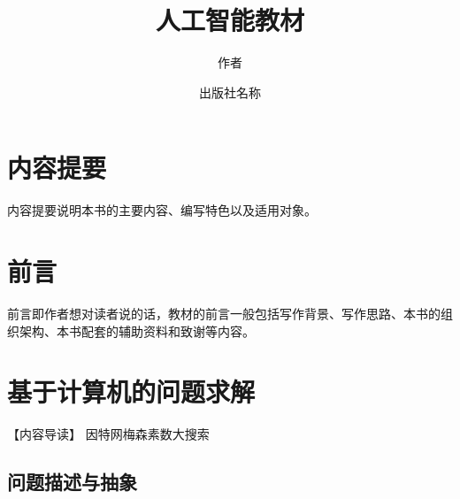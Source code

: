 \documentclass[fontset=windows,openany,UTF8]{ctexbook}
\begin{document}
\title{人工智能教材}
\author{作者}
\date{\vspace*{3in}出版社名称}

\maketitle
\thispagestyle{empty}
\frontmatter

\chapter*{内容提要}

内容提要说明本书的主要内容、编写特色以及适用对象。
\clearpage

\chapter*{前\qquad 言}
前言即作者想对读者说的话，教材的前言一般包括写作背景、写作思路、本书的组织架构、本书配套的辅助资料和致谢等内容。


{\centering\tableofcontents}

\mainmatter

\chapter{基于计算机的问题求解}
\noindent【内容导读】 因特网梅森素数大搜索

\section{问题描述与抽象}
\end{document}
